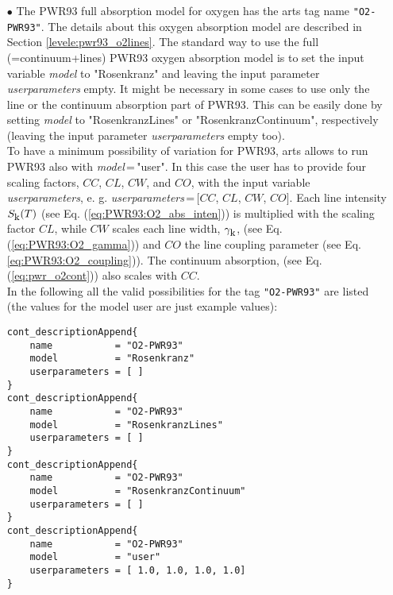 \begin{itemize}
\item[$\bullet$] The PWR93 full absorption model for oxygen \citep{pwr:93}
     has the arts tag name {\tt "O2-PWR93"}. The details about this 
     oxygen absorption model are described in Section \ref{levele:pwr93_o2lines}. 
     The standard way to use the full (=continuum+lines) PWR93 oxygen 
     absorption model is to set the input variable {\it model} 
     to "Rosenkranz" and leaving the input parameter {\it userparameters} empty. 
     It might be necessary in some cases to use only the line or the 
     continuum absorption part of PWR93. This can be easily done 
     by setting {\it model} to "RosenkranzLines" or "RosenkranzContinuum", 
     respectively (leaving the input parameter {\it userparameters} 
     empty too).\\ To have a minimum possibility of variation for PWR93, 
     arts allows to run PWR93 also with {\it model}\,=\,"user". 
     In this case the user has to provide four scaling factors,  
     $CC$, $CL$, $CW$, and $CO$, with the input variable {\it userparameters}, 
     e. g. {\it userparameters}\,=\,$[$$CC$, $CL$, $CW$, $CO$$]$. 
     Each line intensity $S_{\mbox{\rm \small k}}(T)$ (see Eq. (\ref{eq:PWR93:O2_abs_inten})) 
     is multiplied with the scaling factor $CL$, while $CW$ scales 
     each line width, $\gamma_{\mbox{\rm \small k}}$, (see Eq. (\ref{eq:PWR93:O2_gamma})) and 
     $CO$ the line coupling parameter (see Eq. \ref{eq:PWR93:O2_coupling})). 
     The continuum absorption, (see Eq. (\ref{eq:pwr_o2cont})) 
     also scales with $CC$.\\
     In the following all the valid possibilities for the
     tag {\tt "O2-PWR93"} are listed (the values for the 
     model user are just example values):
\begin{lstlisting}
cont_descriptionAppend{
    name           = "O2-PWR93"
    model          = "Rosenkranz"
    userparameters = [ ]
}
cont_descriptionAppend{
    name           = "O2-PWR93"
    model          = "RosenkranzLines"
    userparameters = [ ]
}
cont_descriptionAppend{
    name           = "O2-PWR93"
    model          = "RosenkranzContinuum"
    userparameters = [ ]
}
cont_descriptionAppend{
    name           = "O2-PWR93"
    model          = "user"
    userparameters = [ 1.0, 1.0, 1.0, 1.0]
}
\end{lstlisting}
\end{itemize}

